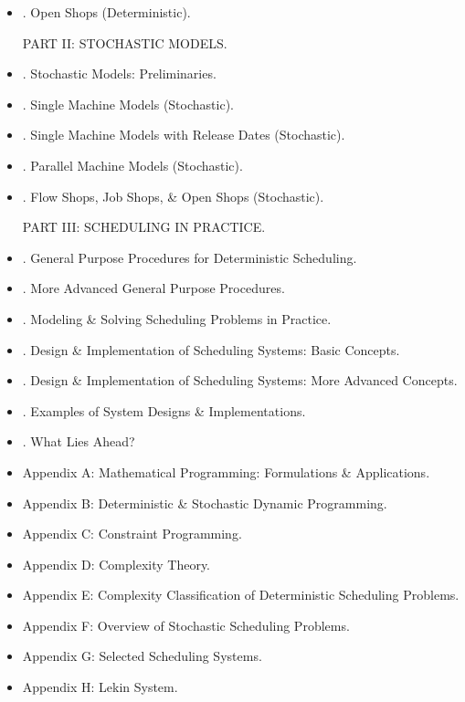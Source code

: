 \documentclass{article}
\newtheorem{example}{Example}
\begin{document}
\begin{itemize}
\begin{itemize}
\begin{example}[Application of branch \& bound]
            -- Xét trường hợp được mô tả trong Ví dụ 7.1.1. Đồ thị ban đầu chỉ chứa các cung liên hợp \& được mô tả trong {\sf Hình 7.3a: Đồ thị thứ tự ưu tiên ở Cấp độ 1 trong Ví dụ 7.1.4}. Makespan tương ứng với đồ thị này là 22. Áp dụng thủ tục branch-\&-bound cho trường hợp này sẽ cho ra cây branch-\&-bound sau.

            p. 194+++
        \end{example}

        \item {. Shifting Bottleneck Heuristic \& Makespan.}
    \end{itemize}

    \item {. Open Shops (Deterministic).}

    PART II: STOCHASTIC MODELS.
    \item {. Stochastic Models: Preliminaries.}
    \item {. Single Machine Models (Stochastic).}
    \item {. Single Machine Models with Release Dates (Stochastic).}
    \item {. Parallel Machine Models (Stochastic).}
    \item {. Flow Shops, Job Shops, \& Open Shops (Stochastic).}

    PART III: SCHEDULING IN PRACTICE.
    \item {. General Purpose Procedures for Deterministic Scheduling.}
    \item {. More Advanced General Purpose Procedures.}
    \item {. Modeling \& Solving Scheduling Problems in Practice.}
    \item {. Design \& Implementation of Scheduling Systems: Basic Concepts.}
    \item {. Design \& Implementation of Scheduling Systems: More Advanced Concepts.}
    \item {. Examples of System Designs \& Implementations.}
    \item {. What Lies Ahead?}
    \item {\sf Appendix A: Mathematical Programming: Formulations \& Applications.}
    \item {\sf Appendix B: Deterministic \& Stochastic Dynamic Programming.}
    \item {\sf Appendix C: Constraint Programming.}
    \item {\sf Appendix D: Complexity Theory.}
    \item {\sf Appendix E: Complexity Classification of Deterministic Scheduling Problems.}
    \item {\sf Appendix F: Overview of Stochastic Scheduling Problems.}
    \item {\sf Appendix G: Selected Scheduling Systems.}
    \item {\sf Appendix H: Lekin System.}
\end{itemize}
\end{document}
